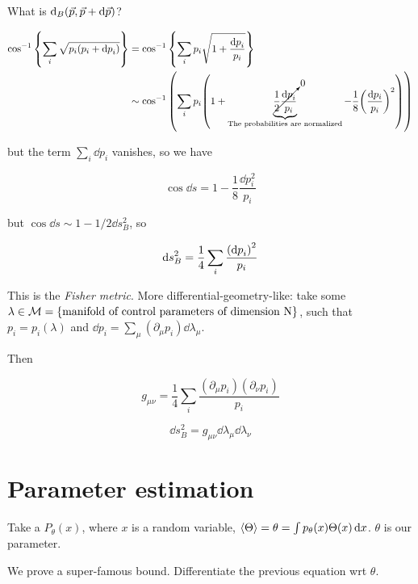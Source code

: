 What is \( \dd _{B} \qty(\vec{p} , \vec{p} + \dd{\vec{p}}) \)?

\begin{align}
  \cos ^{-1} \qty{\sum_i \sqrt{p_i(p_i + \dd{p}_i)}}
  &= \cos ^{-1} \qty{\sum_i p_i \sqrt{1 + \frac{\dd{p}_i }{p_i}}}  \\
  &\sim \cos ^{-1} \qty(\sum_i p_i \qty(1 + \underbrace{\cancelto{0}{\frac{1}{2} \frac{\dd{p}_i}{p_i}}}_{\text{The probabilities  are normalized}}     - \frac{1}{8} \qty(\frac{\dd{p_i}}{p_i})^{2} ))
\end{align}

but the term \( \sum_i \dd{p}_i \) vanishes, so we have

\begin{equation}
  \cos \dd{s} = 1 - \frac{1}{8}\frac{\dd{p}_i ^{2} }{p_i}
\end{equation}

but \( \cos \dd{s} \sim 1 - 1/2 \dd{s}^{2} _{B}  \), so

\begin{equation} \label{eq:fisher-metric}
  \dd{s}^{2}_{B}  = \frac{1}{4} \sum_i  \frac{\qty(\dd{p}_i)^{2} }{p_i}
\end{equation}

This is the \emph{Fisher metric}. More differential-geometry-like: take some \( \lambda \in \mathcal{M} = \qty{\text{manifold of control parameters of dimension N}} \), such that \( p_i = p_i(\lambda) \) and  \( \dd{p}_i = \sum_\mu (\partial_\mu p_i) \dd{\lambda_\mu} \).

Then

\begin{equation}
  g _{\mu \nu} = \frac{1}{4} \sum_i \frac{(\partial_\mu p_i)(\partial_\nu p_i)}{p_i}
\end{equation}

\begin{equation}
  \dd{s}_B ^2 = g _{\mu \nu} \dd{\lambda}_\mu \dd{\lambda}_\nu
\end{equation}

\section{Parameter estimation}

Take a \(P_\theta (x)\), where \( x \) is a random variable, \( \expval{\Theta} = \theta = \int  p_\theta(x) \Theta(x) \dd{x}  \). \(\theta\) is our parameter.

We prove a super-famous bound. Differentiate the previous equation wrt \( \theta \).

